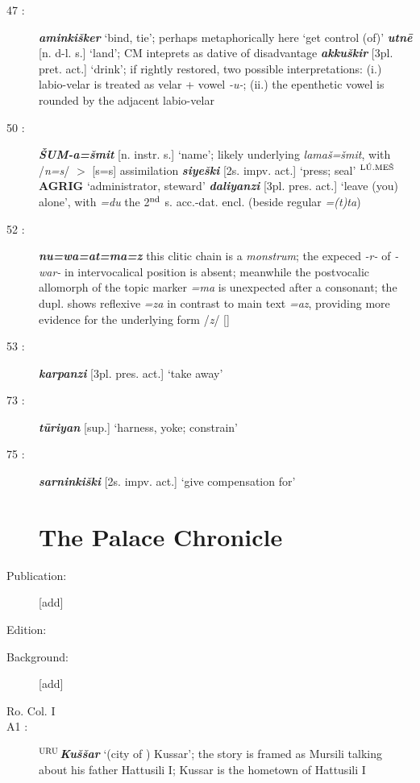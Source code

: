 \documentclass[10pt]{article}
\newcommand{\supersc}[1]{$^{\textrm{\scriptsize{#1}}}$}  	%
\newcommand{\bit}[1]{\textbf{\textit{#1}}}				%
\newcommand{\p}[1]{{\tiny[{#1}]}}					%
\newcommand{\hith}{\textsubwedge{h}}
\newcommand{\men}{\supersc{L\'U.ME\v{S}}}
\newcommand{\city}{\supersc{URU}}
\renewcommand{\.}[1]{\textsubdot{#1}}
\begin{document}
\begin{description}
\item[47 :] \bit{{\hith}aminki\v{s}ker} `bind, tie'; perhaps metaphorically here `get control (of)' \bit{utn\=e} \p{n. d-l. s.} `land'; CM inteprets as dative of disadvantage \bit{akku\v{s}kir} \p{3pl. pret. act.} `drink'; if rightly restored, two possible interpretations: (i.) labio-velar is treated as velar + vowel \textit{-u-}; (ii.) the epenthetic vowel is rounded by the adjacent labio-velar

\item[50 :] \bit{\v{S}UM-a=\v{s}mit} \p{n. instr. s.} `name'; likely underlying \textit{lama\v{s}=\v{s}mit}, with /\textit{n=s}/ $>$ [s=s] assimilation \bit{siye\v{s}ki} \p{2s. impv. act.} `press; seal' \textbf{{\men}AGRIG} `administrator, steward' \bit{daliyanzi} \p{3pl. pres. act.} `leave (you) alone', with \textit{=du} the 2\supersc{nd} s. acc.-dat. encl. (beside regular \textit{=(t)ta})

\item[52 :] \bit{nu=wa=at=ma=z} this clitic chain is a \textit{monstrum}; the expeced \textit{-r-} of \textit{-war-} in intervocalical position is absent; meanwhile the postvocalic allomorph of the topic marker \textit{=ma} is unexpected after a consonant; the dupl. shows reflexive \textit{=za} in contrast to main text \textit{=az}, providing more evidence for the underlying form /\textit{z}/ [\texttslig]

\item[53 :] \bit{karpanzi} \p{3pl. pres. act.} `take away'

\item[73 :] \bit{t\=uriyan} \p{sup.} `harness, yoke; constrain'

\item[75 :] \bit{sarninki\v{s}ki} \p{2s. impv. act.} `give compensation for'


\section{The Palace Chronicle}
\item[Publication:] [add]
\item[Edition:] \citet{dardano1997palace}
\item[Background:] [add] \\

\item[Ro. Col. I]

\item[A1 :] \textbf{{\city}}\bit{Ku\v{s}\v{s}ar} `(city of ) Kussar'; the story is framed as Mursili talking about his father Hattusili I; Kussar is the hometown of Hattusili I


\end{description}
\end{document}
